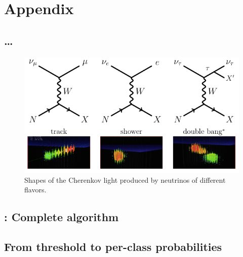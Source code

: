 \chapter{Appendix}
\blindtext

\section{…} %
\begin{figure}
  \centering
  \includegraphics[width=\textwidth]{content/img/flavors1.png}
  \caption{
    Shapes of the Cherenkov light produced by neutrinos of different flavors.
    \citationneeded{}
  }
  \label{fig:img:icecube:interactions}
\end{figure}


\section{\dseaplus{}: Complete algorithm} \label{sec:alg:dseaplus}



\section{From threshold to per-class probabilities}
\label{sec:appendix:corn_probas}
\blindtext


